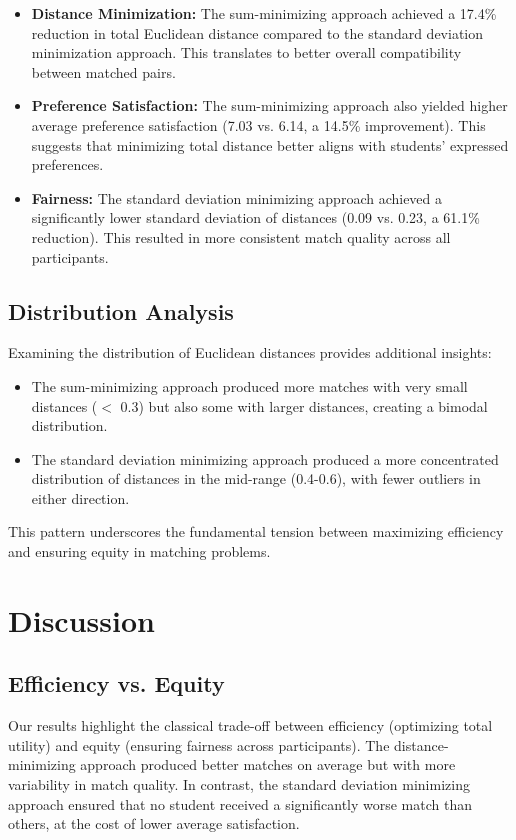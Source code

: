 \documentclass[10pt,journal,compsoc]{IEEEtran}
\begin{document}
\begin{itemize}
\item \textbf{Distance Minimization:} The sum-minimizing approach achieved a 17.4\% reduction in total Euclidean distance compared to the standard deviation minimization approach. This translates to better overall compatibility between matched pairs.

\item \textbf{Preference Satisfaction:} The sum-minimizing approach also yielded higher average preference satisfaction (7.03 vs. 6.14, a 14.5\% improvement). This suggests that minimizing total distance better aligns with students' expressed preferences.

\item \textbf{Fairness:} The standard deviation minimizing approach achieved a significantly lower standard deviation of distances (0.09 vs. 0.23, a 61.1\% reduction). This resulted in more consistent match quality across all participants.
\end{itemize}

\subsection{Distribution Analysis}

Examining the distribution of Euclidean distances provides additional insights:

\begin{itemize}
\item The sum-minimizing approach produced more matches with very small distances ($<$ 0.3) but also some with larger distances, creating a bimodal distribution.
\item The standard deviation minimizing approach produced a more concentrated distribution of distances in the mid-range (0.4-0.6), with fewer outliers in either direction.
\end{itemize}

This pattern underscores the fundamental tension between maximizing efficiency and ensuring equity in matching problems.

\section{Discussion}

\subsection{Efficiency vs. Equity}
Our results highlight the classical trade-off between efficiency (optimizing total utility) and equity (ensuring fairness across participants). The distance-minimizing approach produced better matches on average but with more variability in match quality. In contrast, the standard deviation minimizing approach ensured that no student received a significantly worse match than others, at the cost of lower average satisfaction.
\end{document}
